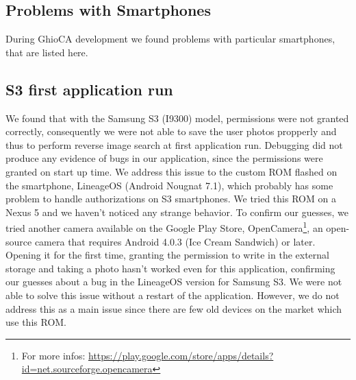\subsection{Problems with Smartphones}

During GhioCA development we found problems with particular smartphones, that
are listed here.

\subsection{S3 first application run}

We found that with the Samsung S3 (I9300) model, permissions were not granted
correctly, consequently we were not able to save the user photos propperly and 
thus to perform reverse image search at first application run. Debugging did
not produce any evidence of bugs in our application, since the permissions were
granted on start up time.
We address this issue to the custom ROM flashed on the smartphone, LineageOS
(Android Nougnat 7.1), which probably has some problem to handle authorizations
on S3 smartphones. We tried this ROM on a Nexus 5 and we haven't noticed any
strange behavior.
To confirm our guesses, we tried another camera available on the Google Play
Store, OpenCamera\footnote{For more infos:
\url{https://play.google.com/store/apps/details?id=net.sourceforge.opencamera}},
 an open-source camera that requires Android 4.0.3 (Ice Cream Sandwich) or
later.
Opening it for the first time, granting the permission to write in the external
storage and taking a photo hasn't worked even for this application, confirming
our guesses about a bug in the LineageOS version for Samsung S3.
We were not able to solve this issue without a restart of the application.
However, we do not address this as a main issue since there are few old devices
on the market which use this ROM.
